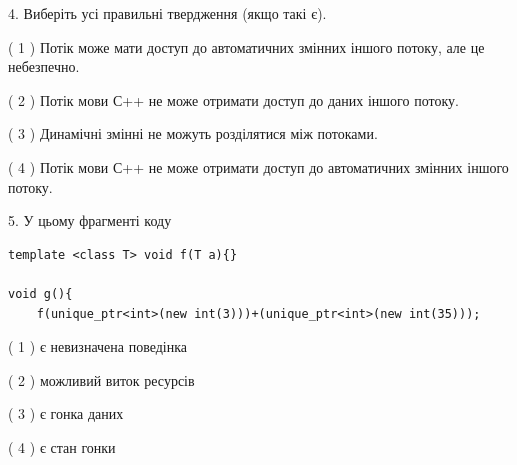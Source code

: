\documentclass[12pt, ukrainian]{article}
\begin{document}
\begin {large}
{%
4. Виберіть усі правильні твердження (якщо такі є).\par
\vspace{2mm}

( 1 ) Потік може мати доступ до автоматичних змінних іншого потоку, але це небезпечно.%

( 2 ) Потік мови С++ не може отримати доступ до даних іншого потоку.%

( 3 ) Динамічні змінні не можуть розділятися між потоками.%

( 4 ) Потік мови С++ не може отримати доступ до автоматичних змінних іншого потоку.%


5. У цьому фрагменті коду
\begin{verbatim}
template <class T> void f(T a){}

void g(){
    f(unique_ptr<int>(new int(3)))+(unique_ptr<int>(new int(35)));
\end{verbatim}

( 1 ) є невизначена поведінка%

( 2 ) можливий виток ресурсів%

( 3 ) є гонка даних%

( 4 ) є стан гонки%
}
\end {large}
\end{document}
